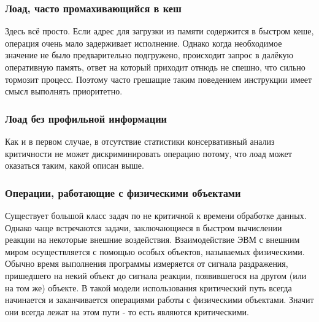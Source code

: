 \documentclass[a4paper,12pt,titlepage]{article}
\begin{document}
\subsubsection{Лоад, часто промахивающийся в кеш}
Здесь всё просто. Если адрес для загрузки из памяти содержится в быстром кеше, операция очень мало задерживает исполнение. Однако когда необходимое значение не было предварительно подгружено, происходит запрос в далёкую оперативную память, ответ на который приходит отнюдь не спешно, что сильно тормозит процесс. Поэтому часто грешащие таким поведением инструкции имеет смысл выполнять приоритетно.
\subsubsection{Лоад без профильной информации}
Как и в первом случае, в отсутствие статистики консервативный анализ критичности не может дискриминировать операцию потому, что лоад может оказаться таким, какой описан выше.
\subsubsection{Операции, работающие с физическими объектами}
Существует большой класс задач по не критичной к времени обработке данных. Однако чаще встречаются задачи, заключающиеся в быстром вычислении реакции на некоторые внешние воздействия. Взаимодействие ЭВМ с внешним миром осуществляется с помощью особых объектов, называемых физическими. Обычно время выполнения программы измеряется от сигнала раздражения, пришедшего на некий объект до сигнала реакции, появившегося на другом (или на том же) объекте. В такой модели использования критический путь всегда начинается и заканчивается операциями работы с физическими объектами. Значит они всегда лежат на этом пути - то есть являются критическими.
\end{document}
